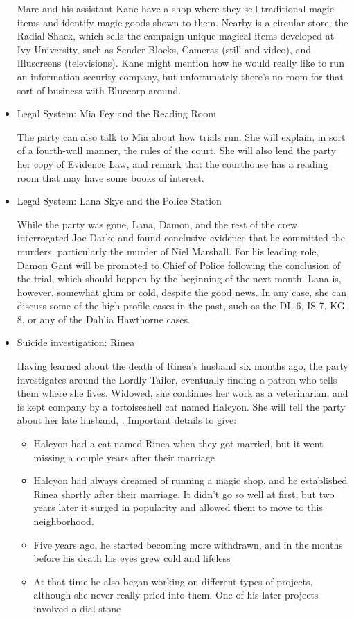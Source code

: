 \begin{itemize}
Marc and his assistant Kane have a shop where they sell traditional magic items and identify magic goods shown to them. Nearby is a circular store, the Radial Shack, which sells the campaign-unique magical items developed at Ivy University, such as Sender Blocks, Cameras (still and video), and Illuscreens (televisions). Kane might mention how he would really like to run an information security company, but unfortunately there's no room for that sort of business with Bluecorp around.

\item Legal System: Mia Fey and the Reading Room

The party can also talk to Mia about how trials run. She will explain, in sort of a fourth-wall manner, the rules of the court. She will also lend the party her copy of Evidence Law, and remark that the courthouse has a reading room that may have some books of interest.

\item Legal System: Lana Skye and the Police Station

While the party was gone, Lana, Damon, and the rest of the crew interrogated Joe Darke and found conclusive evidence that he committed the murders, particularly the murder of Niel Marshall. For his leading role, Damon Gant will be promoted to Chief of Police following the conclusion of the trial, which should happen by the beginning of the next month. Lana is, however, somewhat glum or cold, despite the good news. In any case, she can discuss some of the high profile cases in the past, such as the DL-6, IS-7, KG-8, or any of the Dahlia Hawthorne cases. 

\item Suicide investigation: Rinea

Having learned about the death of Rinea's husband six months ago, the party investigates around the Lordly Tailor, eventually finding a patron who tells them where she lives. Widowed, she continues her work as a veterinarian, and is kept company by a tortoiseshell cat named Halcyon. She will tell the party about her late husband, . Important details to give:
\begin{itemize}
\item Halcyon had a cat named Rinea when they got married, but it went missing a couple years after their marriage
\item Halcyon had always dreamed of running a magic shop, and he established Rinea shortly after their marriage. It didn't go so well at first, but two years later it surged in popularity and allowed them to move to this neighborhood. 
\item Five years ago, he started becoming more withdrawn, and in the months before his death his eyes grew cold and lifeless
\item At that time he also began working on different types of projects, although she never really pried into them. One of his later projects involved a dial stone
\end{itemize}

\end{itemize}


